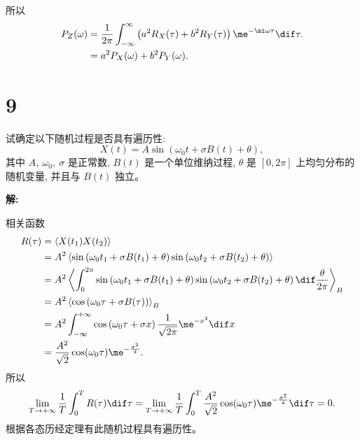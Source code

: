 \documentclass[12pt,a4]{ctexart}
\begin{document}
所以
\begin{equation}
	\begin{aligned}
		P_Z(\omega) & =\frac{1}{2\pi} \int^{\infty}_{-\infty} \left(a^2 R_X(\tau) + b^2 R_Y(\tau)\right) \me^{-\mi \omega \tau} \dif \tau. \\
		            & = a^2 P_X(\omega) + b^2 P_Y(\omega).
	\end{aligned}
\end{equation}



\section{9}


试确定以下随机过程是否具有遍历性:
\begin{equation}
	X(t)=A \sin \left(\omega_{0} t+\sigma B(t)+\theta \right),
\end{equation}
其中 $A,\ \omega_{0},\ \sigma$ 是正常数, $B(t)$ 是一个单位维纳过程, $\theta$ 是 $[0,2 \pi]$ 上均匀分布的随机变量, 并且与 $B(t)$ 独立。

\textsf{\hspace{-2em}\sf  \textbf{解:}}

相关函数
\begin{equation}
	\begin{aligned}
		R(\tau) & = \left\langle X(t_1) X(t_2) \right\rangle                                                                                                                                                  \\
		        & = A^2 \left\langle \sin \left(\omega_{0} t_1 + \sigma B(t_1)+\theta \right) \sin \left(\omega_{0} t_2 + \sigma B(t_2)+\theta \right) \right\rangle                                          \\
		        & = A^2 \left\langle \int_0^{2\pi} \sin \left(\omega_{0} t_1 + \sigma B(t_1)+\theta \right) \sin \left(\omega_{0} t_2 + \sigma B(t_2)+\theta \right) \dif \frac{\theta}{2\pi} \right\rangle_B \\
		        & = A^2 \left\langle  \cos \left(\omega_{0} \tau + \sigma B(\tau) \right) \right\rangle_B                                                                                                     \\
		        & = A^2 \int^{+\infty}_{-\infty}  \cos \left(\omega_{0} \tau + \sigma x \right) \frac{1}{\sqrt{2\pi}} \me^{-x^2} \dif x                                                                       \\
		        & = \frac{A^2}{\sqrt{2}} \cos(\omega_0 \tau) \me^{-\frac{\sigma^2}{4}}.
	\end{aligned}
\end{equation}
所以
\begin{equation}
	\lim_{T \to +\infty} \frac{1}{T} \int^T_0 R(\tau) \dif \tau = \lim_{T \to +\infty} \frac{1}{T} \int^T_0 \frac{A^2}{\sqrt{2}} \cos(\omega_0 \tau) \me^{-\frac{\sigma^2}{4}} \dif \tau = 0.
\end{equation}
根据各态历经定理有此随机过程具有遍历性。
\end{document}
